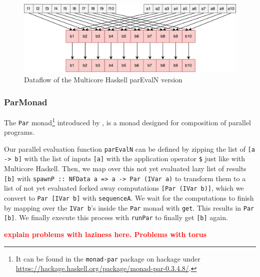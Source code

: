 \documentclass{jfp1}
\newcommand{\inlinecode}[1]{\texttt{#1}}
\begin{document}

\begin{figure}[h]
	\includegraphics[scale=0.5]{images/parEvalNMulticore}
	\caption{Dataflow of the Multicore Haskell parEvalN version}
\end{figure} %

\subsubsection{ParMonad}
The \inlinecode{Par} monad\footnote{It can be found in the \texttt{monad-par} package on hackage under \url{https://hackage.haskell.org/package/monad-par-0.3.4.8/}.} introduced by \citet{monad_par_paper_2011}, is a monad designed for composition of parallel programs.


Our parallel evaluation function \inlinecode{parEvalN} can be defined by zipping the list of \inlinecode{[a -> b]} with the list of inputs \inlinecode{[a]} with the application operator \inlinecode{\$} just like with Multicore Haskell. Then, we map over this not yet evaluated lazy list of results \inlinecode{[b]} with \inlinecode{spawnP :: NFData a => a -> Par (IVar a)} to transform them to a list of not yet evaluated forked away computations \inlinecode{[Par (IVar b)]}, which we convert to \inlinecode{Par [IVar b]} with \inlinecode{sequenceA}. We wait for the computations to finish by mapping over the \inlinecode{IVar b}'s inside the \inlinecode{Par} monad with \inlinecode{get}. This results in \inlinecode{Par [b]}. We finally execute this process with \inlinecode{runPar} to finally get \inlinecode{[b]} again.

\textbf{\textcolor{red}{explain problems with laziness here. Problems with torus}}
\end{document}
